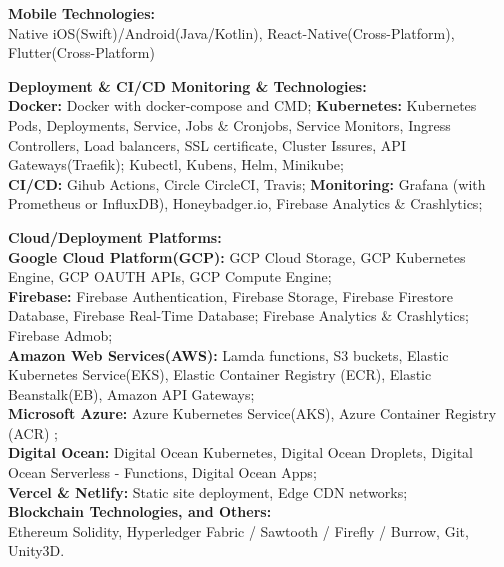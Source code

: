 \documentclass{article}
\begin{document}
\noindent \normalsize \textbf{Mobile Technologies:} \\
\noindent \normalsize Native iOS(Swift)/Android(Java/Kotlin), React-Native(Cross-Platform), Flutter(Cross-Platform)
\vspace{5pt}

\noindent \normalsize \textbf{Deployment \& CI/CD Monitoring \& Technologies:} \\
\textbf{Docker:} Docker with docker-compose and CMD; 
\textbf{Kubernetes:} Kubernetes Pods, Deployments, Service, Jobs \& Cronjobs, Service Monitors, Ingress Controllers, Load balancers, SSL certificate, Cluster Issures, API Gateways(Traefik); Kubectl, Kubens, Helm, Minikube;\\
\textbf{CI/CD:} Gihub Actions, Circle CircleCI, Travis;
\textbf{Monitoring:} Grafana (with Prometheus or InfluxDB), Honeybadger.io,  Firebase Analytics \& Crashlytics;
\vspace{5pt}

\noindent \normalsize \textbf{Cloud/Deployment Platforms:}\\
\textbf{Google Cloud Platform(GCP):} GCP Cloud Storage, GCP Kubernetes Engine, GCP OAUTH APIs, GCP Compute Engine;\\
\textbf{Firebase:} Firebase Authentication, Firebase Storage, Firebase Firestore Database, Firebase Real-Time Database; Firebase Analytics \& Crashlytics; Firebase Admob;\\
\textbf{Amazon Web Services(AWS):} Lamda functions, S3 buckets, Elastic Kubernetes Service(EKS), Elastic Container Registry (ECR), Elastic Beanstalk(EB), Amazon API Gateways;\\
\textbf{Microsoft Azure:} Azure Kubernetes Service(AKS), Azure Container Registry (ACR) ;\\
\textbf{Digital Ocean:} Digital Ocean Kubernetes, Digital Ocean Droplets, Digital Ocean Serverless - Functions, Digital Ocean Apps;\\
\textbf{Vercel \& Netlify:} Static site deployment, Edge CDN networks;\\  

\noindent \normalsize \textbf{Blockchain Technologies, and Others:}\\
\noindent \normalsize Ethereum Solidity, Hyperledger Fabric / Sawtooth / Firefly / Burrow, Git, Unity3D.
\end{document}
